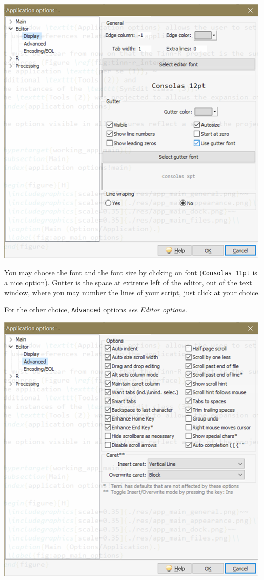 \vspace{5mm}
\includegraphics[scale=0.8]{./res/app_editor_display.png}
\vspace{5mm}

You may choose the font and the font size by clicking on font (\texttt{Consolas 11pt} is a nice option).
Gutter is the space at extreme left of the editor, out of the text window,
where you may number the lines of your script, just click at your choice.

For the other choice, \texttt{Advanced} options \textit{\href{\#working\_editor}{see Editor options}}.

\vspace{5mm}
\includegraphics[scale=0.8]{./res/app_editor_advanced.png}\\
\vspace{5mm}


